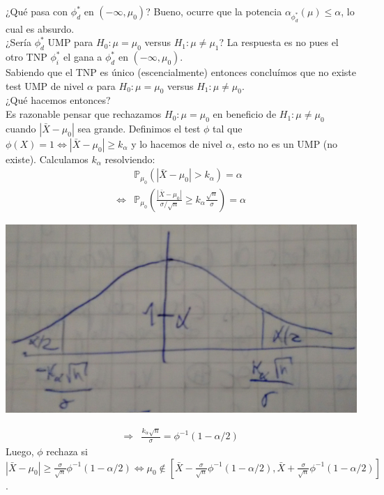 \documentclass[10pt]{article}
\theoremstyle{plain}
\theoremstyle{definition}
\begin{document}
¿Qué pasa con $\phi^*_{d}$ en $(-\infty, \mu_{0})$? Bueno, ocurre que la potencia $\alpha_{\phi^*_{d}}(\mu) \le \alpha$, lo cual es absurdo.\\

¿Sería $\phi^*_{d}$ UMP para $H_{0}: \mu=\mu_{0}$ versus $H_{1}: \mu \not = \mu_{1}$? La respuesta es no pues el otro TNP $\phi^*_{i}$ el gana a $\phi^*_{d}$ en $(-\infty, \mu_{0})$.\\

Sabiendo que el TNP es único (escencialmente) entonces concluímos que no existe test UMP de nivel $\alpha$ para $H_{0}: \mu = \mu_{0}$ versus $H_{1}: \mu \not = \mu_{0}$.\\

¿Qué hacemos entonces?\\
Es razonable pensar que rechazamos $H_{0}: \mu = \mu_{0}$ en beneficio de $H_{1}: \mu \not = \mu_{0}$ cuando $|\bar{X}-\mu_{0}|$ sea grande. Definimos el test $\phi$ tal que $\phi(X)=1 \Leftrightarrow |\bar{X}-\mu_{0}|\ge k_{\alpha}$ y lo hacemos de nivel $\alpha$, esto no es un UMP (no existe). Calculamos $k_{\alpha}$ resolviendo:
\begin{align*}
&\mathbb{P}_{\mu_{0}}\left(|\bar{X}-\mu_{0}|>k_{\alpha}\right) = \alpha\\
 \Leftrightarrow & \mathbb{P}_{\mu_{0}}\left(\frac{|\bar{X}-\mu_{0}|}{\sigma/\sqrt{n}}\ge k_{\alpha}\frac{\sqrt{n}}{\sigma}\right) = \alpha
\end{align*}
\begin{center}
\includegraphics[scale=0.1]{imagenes/bilateral.jpg}
\end{center}
\begin{align*}
\Rightarrow & \frac{k_{\alpha}\sqrt{n}}{\sigma} = \phi^{-1}(1-\alpha/2)
\end{align*}
Luego, $\phi$ rechaza si $|\bar{X}-\mu_{0}| \ge \frac{\sigma}{\sqrt{n}}\phi^{-1}(1-\alpha/2) \Leftrightarrow \mu_{0} \not \in [\bar{X}-\frac{\sigma}{\sqrt{n}}\phi^{-1}(1-\alpha/2), \bar{X}+\frac{\sigma}{\sqrt{n}}\phi^{-1}(1-\alpha/2)]$.\\
\end{document}
